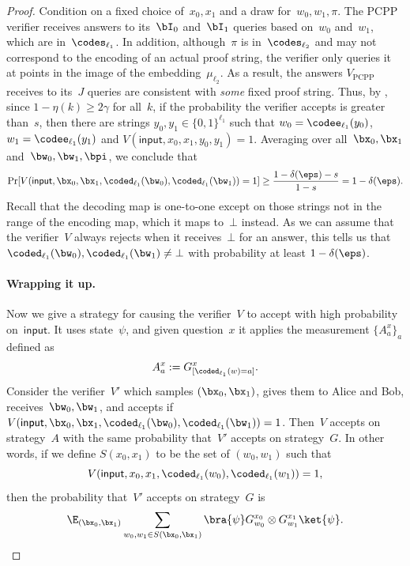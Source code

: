 \begin{proof}
Condition on a fixed choice of~$x_0, x_1$ and a draw for~$w_0, w_1, \pi$.
The PCPP verifier receives answers to its~$\bI_0$ and~$\bI_1$ queries based on~$w_0$ and~$w_1$, which are in~$\codes_{\ell_1}$.
In addition, although~$\pi$ is in~$\codes_{\ell_2}$ and may not correspond to the encoding of an actual proof string,
the verifier only queries it at points in the image of the embedding~$\mu_{\ell_2}$.
As a result, the answers $V_{\mathrm{PCPP}}$ receives to its~$J$ queries are consistent with \emph{some} fixed proof string.
Thus, by , since $1-\eta(k) \geq 2\gamma$ for all~$k$, if the probability
the verifier accepts is greater than~$s$, then there are strings $y_0, y_1 \in \{0, 1\}^{\ell_1}$
such that $w_0 = \codee_{\ell_1}(y_0)$, $w_1 = \codee_{\ell_1}(y_1)$
and $V(\mathsf{input}, x_0, x_1, y_0, y_1) = 1$.
Averaging over all~$\bx_0, \bx_1$ and~$\bw_0, \bw_1, \bpi$, we conclude that
\begin{equation}\label{eq:absolute-unit-of-a-strategy}
\Pr[V(\mathsf{input}, \bx_0, \bx_1, \coded_{\ell_1}(\bw_0), \coded_{\ell_1}(\bw_1)) = 1] \geq \frac{1-\delta(\eps)-s}{1-s} = 1-\delta(\eps).
\end{equation}
Recall that the decoding map is one-to-one except on those strings not in the range of the encoding map, which it maps to~$\bot$ instead.
As we can assume that the verifier~$V$ always rejects when it receives~$\bot$ for an answer,
this tells us that $\coded_{\ell_1}(\bw_0), \coded_{\ell_1}(\bw_1) \neq \bot$ with probability at least $1-\delta(\eps)$.

\paragraph{Wrapping it up.}
Now we give a strategy for causing the verifier~$V$ to accept with high probability on~$\mathsf{input}$.
It uses state~$\psi$, and given question~$x$ it applies the measurement $\{A^x_a\}_a$ defined as
\begin{equation*}
A^x_a := G^x_{[\coded_{\ell_1}(w) = a]}.
\end{equation*}
Consider the verifier~$V'$ which samples $(\bx_0, \bx_1)$, gives them to Alice and Bob, receives~$\bw_0, \bw_1$,
and accepts if $V(\mathsf{input}, \bx_0, \bx_1, \coded_{\ell_1}(\bw_0), \coded_{\ell_1}(\bw_1)) = 1$.
Then~$V$ accepts on strategy~$A$ with the same probability that~$V'$ accepts on strategy~$G$.
In other words, if we define $S(x_0, x_1)$ to be the set of $(w_0, w_1)$
such that
\begin{equation*}
V(\mathsf{input}, x_0, x_1, \coded_{\ell_1}(w_0), \coded_{\ell_1}(w_1))=1,
\end{equation*}
then the probability that~$V'$ accepts on strategy~$G$ is
\begin{equation}\label{eq:its-the-final-countdown}
\E_{(\bx_0, \bx_1)} \sum_{w_0, w_1 \in S(\bx_0, \bx_1)} \bra{\psi} G^{x_0}_{w_0} \otimes G^{x_1}_{w_1}\ket{\psi}.
\end{equation}


\end{proof}
